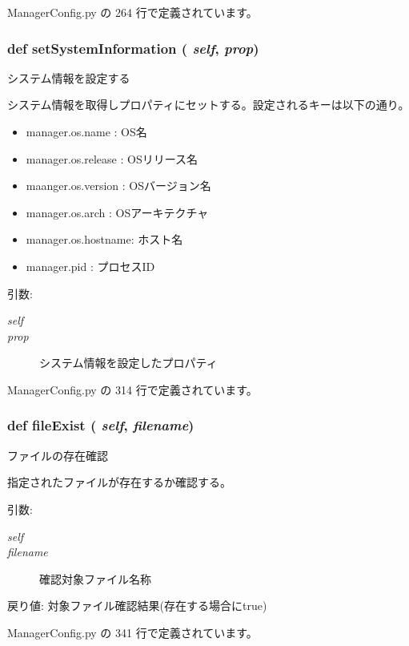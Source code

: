  ManagerConfig.py の 264 行で定義されています。
\subsubsection{\setlength{\rightskip}{0pt plus 5cm}def setSystemInformation ( {\em self},  {\em prop})}\label{classsource__py_1_1_manager_config_1_1_manager_config_1fed2bbe785be4d26fb4bfd54a838209}


システム情報を設定する 

システム情報を取得しプロパティにセットする。設定されるキーは以下の通り。\begin{itemize}
\item manager.os.name : OS名\item manager.os.release : OSリリース名\item maanger.os.version : OSバージョン名\item manager.os.arch : OSアーキテクチャ\item manager.os.hostname: ホスト名\item manager.pid : プロセスID\end{itemize}


\begin{Desc}
\item[引数:]
\begin{description}
\item[{\em self}]\item[{\em prop}]システム情報を設定したプロパティ \end{description}
\end{Desc}


 ManagerConfig.py の 314 行で定義されています。
\subsubsection{\setlength{\rightskip}{0pt plus 5cm}def fileExist ( {\em self},  {\em filename})}\label{classsource__py_1_1_manager_config_1_1_manager_config_775471182727b4e03b9ec4b20b11f754}


ファイルの存在確認 

指定されたファイルが存在するか確認する。

\begin{Desc}
\item[引数:]
\begin{description}
\item[{\em self}]\item[{\em filename}]確認対象ファイル名称\end{description}
\end{Desc}
\begin{Desc}
\item[戻り値:]対象ファイル確認結果(存在する場合にtrue) \end{Desc}


 ManagerConfig.py の 341 行で定義されています。